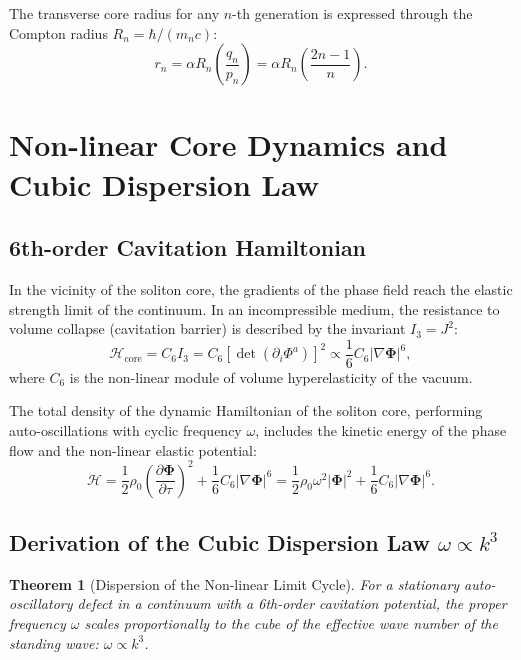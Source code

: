 \documentclass[12pt,a4paper]{article}
\newtheorem{theorem}{Theorem}
\begin{document}
	The transverse core radius for any $n$-th generation is expressed through the Compton radius $R_n = \hbar / (m_n c)$:
	\begin{equation}
	r_n = \alpha R_n \left( \frac{q_n}{p_n} \right) = \alpha R_n \left( \frac{2n-1}{n} \right).
	\end{equation}
	
\section{Non-linear Core Dynamics and Cubic Dispersion Law}
	
	\subsection{6th-order Cavitation Hamiltonian}
	In the vicinity of the soliton core, the gradients of the phase field reach the elastic strength limit of the continuum. In an incompressible medium, the resistance to volume collapse (cavitation barrier) is described by the invariant $I_3 = J^2$:
	\begin{equation}
	\mathcal{H}_{\text{core}} = C_6 I_3 = C_6 \left[ \det\left(\partial_i \Phi^a\right) \right]^2 \propto \frac{1}{6} C_6 |\nabla \boldsymbol{\Phi}|^6,
	\end{equation}
	where $C_6$ is the non-linear module of volume hyperelasticity of the vacuum.
	
	The total density of the dynamic Hamiltonian of the soliton core, performing auto-oscillations with cyclic frequency $\omega$, includes the kinetic energy of the phase flow and the non-linear elastic potential:
	\begin{equation}
	\mathcal{H} = \frac{1}{2} \rho_0 \left( \frac{\partial \boldsymbol{\Phi}}{\partial \tau} \right)^2 + \frac{1}{6} C_6 |\nabla \boldsymbol{\Phi}|^6 = \frac{1}{2} \rho_0 \omega^2 |\boldsymbol{\Phi}|^2 + \frac{1}{6} C_6 |\nabla \boldsymbol{\Phi}|^6.
	\end{equation}
	
	\subsection{Derivation of the Cubic Dispersion Law $\omega \propto k^3$}
	\begin{theorem}[Dispersion of the Non-linear Limit Cycle]
	For a stationary auto-oscillatory defect in a continuum with a 6th-order cavitation potential, the proper frequency $\omega$ scales proportionally to the cube of the effective wave number of the standing wave: $\omega \propto k^3$.
	\end{theorem}
	
\end{document}
